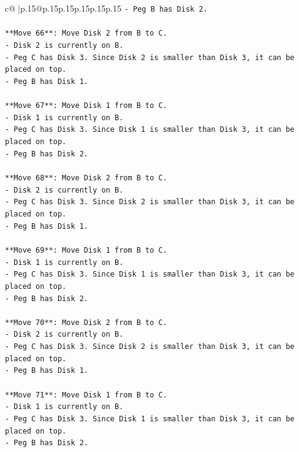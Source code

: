 \documentclass{article}
\begin{document}
{\begin{supertabular}{c@{$\;$}|p{.15\linewidth}@{}p{.15\linewidth}p{.15\linewidth}p{.15\linewidth}p{.15\linewidth}p{.15\linewidth}}
{{{\texttt{{-} Peg B has Disk 2.} \\
\\ 
\texttt{**Move 66**: Move Disk 2 from B to C.} \\
\texttt{{-} Disk 2 is currently on B.} \\
\texttt{{-} Peg C has Disk 3. Since Disk 2 is smaller than Disk 3, it can be placed on top.} \\
\texttt{{-} Peg B has Disk 1.} \\
\\ 
\texttt{**Move 67**: Move Disk 1 from B to C.} \\
\texttt{{-} Disk 1 is currently on B.} \\
\texttt{{-} Peg C has Disk 3. Since Disk 1 is smaller than Disk 3, it can be placed on top.} \\
\texttt{{-} Peg B has Disk 2.} \\
\\ 
\texttt{**Move 68**: Move Disk 2 from B to C.} \\
\texttt{{-} Disk 2 is currently on B.} \\
\texttt{{-} Peg C has Disk 3. Since Disk 2 is smaller than Disk 3, it can be placed on top.} \\
\texttt{{-} Peg B has Disk 1.} \\
\\ 
\texttt{**Move 69**: Move Disk 1 from B to C.} \\
\texttt{{-} Disk 1 is currently on B.} \\
\texttt{{-} Peg C has Disk 3. Since Disk 1 is smaller than Disk 3, it can be placed on top.} \\
\texttt{{-} Peg B has Disk 2.} \\
\\ 
\texttt{**Move 70**: Move Disk 2 from B to C.} \\
\texttt{{-} Disk 2 is currently on B.} \\
\texttt{{-} Peg C has Disk 3. Since Disk 2 is smaller than Disk 3, it can be placed on top.} \\
\texttt{{-} Peg B has Disk 1.} \\
\\ 
\texttt{**Move 71**: Move Disk 1 from B to C.} \\
\texttt{{-} Disk 1 is currently on B.} \\
\texttt{{-} Peg C has Disk 3. Since Disk 1 is smaller than Disk 3, it can be placed on top.} \\
\texttt{{-} Peg B has Disk 2.} \\
}}}
\end{supertabular}}
\end{document}
